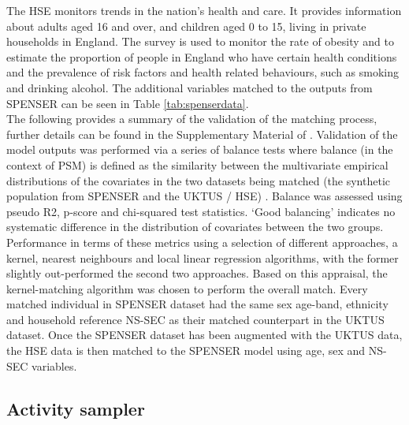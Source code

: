 \documentclass{article}
\begin{document}
\noindent The HSE monitors trends in the nation’s health and care. It provides information about adults aged 16 and over, and children aged 0 to 15, living in private households in England. The survey is used to monitor the rate of obesity and to estimate the proportion of people in England who have certain health conditions and the prevalence of risk factors and health related behaviours, such as smoking and drinking alcohol. The additional variables matched to the outputs from SPENSER can be seen in Table \ref{tab:spenserdata}.\\

The following provides a summary of the validation of the matching process, further details can be found in the Supplementary Material of \cite{spooner2021dynamic}. Validation of the model outputs was performed via a series of balance tests \citep{Jesmin2012} where balance (in the context of PSM) is defined as the similarity between the multivariate empirical distributions of the covariates in the two datasets being matched (the synthetic population from SPENSER and the UKTUS / HSE) \citep{Rosenbaum1984}. Balance was assessed using pseudo R2, p-score and chi-squared test statistics.  ‘Good balancing’ indicates  no systematic difference in the distribution of covariates between the two groups. Performance in terms of these metrics  using a selection of  different approaches, a kernel, nearest neighbours and local linear regression algorithms, with the former slightly out-performed the second two approaches.  Based on this appraisal, the kernel-matching algorithm was chosen to perform the overall match. Every matched individual in SPENSER dataset had the same sex age-band, ethnicity and household reference NS-SEC as their matched counterpart in the UKTUS dataset. Once the SPENSER dataset has been augmented with the UKTUS data, the HSE data is then matched to the SPENSER model using age, sex and NS-SEC variables. \\


\clearpage
\subsection{Activity sampler}\label{sec::activity}

\end{document}
